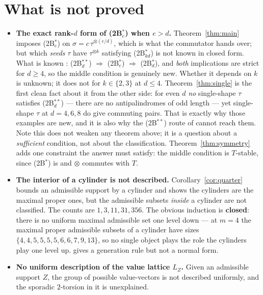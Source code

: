 \documentclass[11pt]{article}
\theoremstyle{definition}
\theoremstyle{remark}
\begin{document}
\section{What is not proved}\label{sec:notprove}

\begin{itemize}
\item[\textbf{(H1)}] \textbf{The exact rank-$d$ form of (2B$^{*}_e$) when $e>d$.}
  Theorem~\ref{thm:main} imposes (2B$^{*}_e$) on $\sigma=c\,\tau^{\otimes(e/d)}$, which is
  what the commutator hands over; but which \emph{seeds} $\tau$ have
  $\tau^{\otimes k}$ satisfying (2B$^{*}_{kd}$) is not known in closed form.  What is known
  \cite[\texttt{rem:gap}]{Q150c1}: (2B$^{**}_d$) $\Rightarrow$ (2B$^{*}_e$) $\Rightarrow$
  (2B$^{*}_d$), and \emph{both} implications are strict for $d\ge4$, so the middle condition
  is genuinely new.  Whether it depends on $k$ is unknown; it does not for $k\in\{2,3\}$ at
  $d\le4$.  Theorem~\ref{thm:single} is the first clean fact about it from the other side: for
  even $d$ \emph{no} single-shape $\tau$ satisfies (2B$^{**}_d$) --- there are no
  antipalindromes of odd length --- yet single-shape $\tau$ at $d=4,6,8$ do give commuting
  pairs.  That is exactly why those examples are new, and it is also why the
  (2B$^{**}$) route of \cite[\texttt{thm:counter}]{Q150c1} cannot reach them.  Note this does not
  weaken any theorem above; it is a question about a \emph{sufficient} condition, not about
  the classification.  Theorem~\ref{thm:symmetry} adds one constraint the answer must satisfy:
  the middle condition is $T$-stable, since (2B$^{*}$) is and $\otimes$ commutes with $T$.

\item[\textbf{(H2a)}] \textbf{The interior of a cylinder is not described.}
  Corollary~\ref{cor:quarter} bounds an admissible support by a cylinder and
  \cite[\texttt{cor:maximal}]{Q150c2} shows the cylinders are the maximal proper ones, but the admissible
  subsets \emph{inside} a cylinder are not classified.  The counts are $1,3,11,31,356$.  The
  obvious induction is \textbf{closed}: there is no uniform maximal admissible set one level
  down --- at $m=4$ the maximal proper admissible subsets of a cylinder have sizes
  $\{4,4,5,5,5,5,6,6,7,9,13\}$, so no single object plays the role the cylinders play one
  level up.  \cite[\texttt{thm:closure}]{Q150c2} gives a generation rule but not a normal
  form.

\item[\textbf{(H2b)}] \textbf{No uniform description of the value lattice $L_Z$.}  Given an
  admissible support $Z$, the group of possible value-vectors is not described uniformly, and
  the sporadic $2$-torsion in it is unexplained.


\end{itemize}
\end{document}
